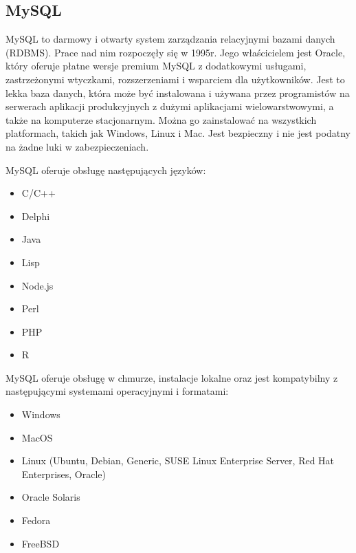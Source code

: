 \documentclass[oneside,polski,logo,indent]{amuthesis}
\begin{document}
\begin{enumerate}
\begin{enumerate}
\section{MySQL}
MySQL to darmowy i otwarty system zarządzania relacyjnymi bazami danych (RDBMS). Prace nad nim rozpoczęły się w 1995r. Jego właścicielem jest Oracle, który oferuje płatne wersje premium MySQL z dodatkowymi usługami, zastrzeżonymi wtyczkami, rozszerzeniami i wsparciem dla użytkowników. Jest to lekka baza danych, która może być instalowana i używana przez programistów na serwerach aplikacji produkcyjnych z dużymi aplikacjami wielowarstwowymi, a także na komputerze stacjonarnym. Można go zainstalować na wszystkich platformach, takich jak Windows, Linux i Mac. Jest bezpieczny i nie jest podatny na żadne luki w zabezpieczeniach. 

MySQL oferuje obsługę następujących języków: 
\begin{itemize}
\item C/C++ 
\item Delphi
\item Java 
\item Lisp 
\item Node.js 
\item Perl 
\item PHP 
\item R
\end{itemize}

MySQL oferuje obsługę w chmurze, instalacje lokalne oraz jest kompatybilny z następującymi systemami operacyjnymi i formatami: 
\begin{itemize}
\item Windows 
\item MacOS 
\item Linux (Ubuntu, Debian, Generic, SUSE Linux Enterprise Server, Red Hat Enterprises, Oracle) 
\item Oracle Solaris 
\item Fedora 
\item FreeBSD 
\end{itemize}


\end{enumerate}
\end{enumerate}
\end{document}

